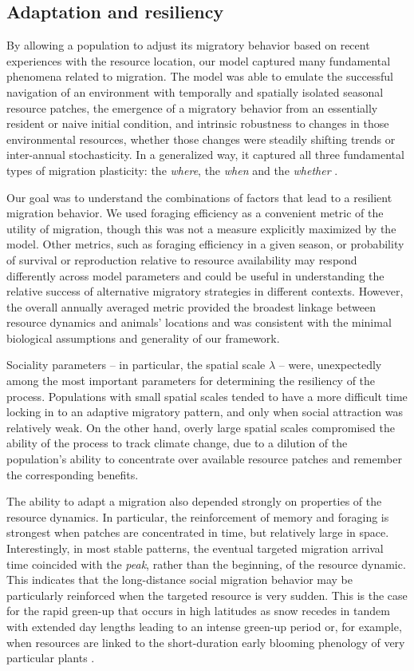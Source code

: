 \documentclass[utf8]{frontiersSCNS} %
\begin{document}
\subsection{Adaptation and resiliency}
	
	By allowing a population to adjust its migratory behavior based on recent experiences with the resource location, our model captured many fundamental phenomena related to migration. The model was able to emulate the successful navigation of an environment with temporally and spatially isolated seasonal resource patches, the emergence of a migratory behavior from an essentially resident or naive initial condition, and intrinsic robustness to changes in those environmental resources, whether those changes were steadily shifting trends or inter-annual stochasticity.  In a generalized way, it captured all three fundamental types of migration plasticity: the \textit{where}, the \textit{when} and the \textit{whether} \citep{Xu2021}.
		
	Our goal was to understand the combinations of factors that lead to a resilient migration behavior. We used foraging efficiency as a convenient metric of the utility of migration, though this was not a measure explicitly maximized by the model. Other metrics, such as foraging efficiency in a given season, or probability of survival or reproduction relative to resource availability \citep{Bauer2020} may respond differently across model parameters and could be useful in understanding the relative success of alternative migratory strategies in different contexts. However, the overall annually averaged metric provided the broadest linkage between resource dynamics and animals' locations and was consistent with the minimal biological assumptions and generality of our framework.
	
	Sociality parameters -- in particular, the spatial scale $\lambda$ -- were, unexpectedly among the most important parameters for determining the resiliency of the process. Populations with small spatial scales tended to have a more difficult time locking in to an adaptive migratory pattern, and only when social attraction was relatively weak. On the other hand, overly large spatial scales compromised the ability of the process to track climate change, due to a dilution of the population's ability to concentrate over available resource patches and remember the corresponding benefits.  
	
	The ability to adapt a migration also depended strongly on properties of the resource dynamics. In particular, the reinforcement of memory and foraging is strongest when patches are concentrated in time, but relatively large in space. Interestingly, in most stable patterns, the eventual targeted migration arrival time coincided with the \emph{peak}, rather than the beginning, of the resource dynamic. This indicates that the long-distance social migration behavior may be particularly reinforced when the targeted resource is very sudden. This is the case for the rapid green-up that occurs in high latitudes as snow recedes in tandem with extended day lengths leading to an intense green-up period \citep{Park2020} or, for example, when resources are linked to the short-duration early blooming phenology of very particular plants \citep{Post2007, Renner2018}. 
	
\end{document}
